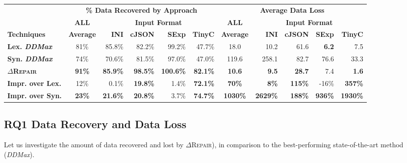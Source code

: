 \documentclass[acmsmall,screen,review,anonymous]{acmart}
\newcommand{\approach}{\textsc{$\Delta$Repair}\xspace}
\newcommand{\ddmax}{\textit{DDMax}\xspace}
\begin{document}
\begin{table*}[!tbp]\centering
\caption{Data Recovery (file size difference) and Data Loss  (Levenshtein distance) of \approach vs. %
lexical (Lex.) \ddmax and syntactic (Syn.) \ddmax. 
The highest data recovery and lowest data loss are in bold, percentage improvement (Impr.) %
of \approach over the best baseline which are significant (i.e., greater than five percent ($>$5\%)) are also in bold.
}
\footnotesize
\begin{tabular}{|l | c |  r  r  r  r  | c |  r  r  r  r |}
\hline
 &  \multicolumn{5}{c|}{\textbf{\% Data Recovered by Approach}} &  \multicolumn{5}{c|}{\textbf{Average Data Loss }}  \\
&  \multicolumn{1}{c|}{\textbf{ALL}} & \multicolumn{4}{c|}{\textbf{Input Format}}  &  \multicolumn{1}{c|}{\textbf{ALL}} & \multicolumn{4}{c|}{\textbf{Input Format}}  \\
\textbf{Techniques} & \textbf{Average} & \textbf{INI} & \textbf{cJSON} & \textbf{SExp} & \textbf{TinyC} & \textbf{Average} & \textbf{INI} & \textbf{cJSON} & \textbf{SExp} & \textbf{TinyC} \\
\hline
\textbf{Lex. \ddmax} & 81\%  & 85.8\% & 82.2\%	 & 99.2\%	& 47.7\% & 18.0 & {10.2} &	61.6 &	\textbf{6.2} & 7.5 \\			
\textbf{Syn. \ddmax} & 74\%  &  70.6\% & 81.5\%  & 97.0\%	& 47.0\% & 119.6 &  258.1 & 82.7 &	76.6 &	33.3 \\	
\hline
\textbf{\approach} & \textbf{91\%}  &  \textbf{85.9\%} & \textbf{98.5\%} & \textbf{100.6\%} & \textbf{82.1\%} & \textbf{10.6}  & \textbf{9.5} &	\textbf{28.7} &	7.4 & \textbf{1.6} \\
\hline
\textbf{Impr. over Lex.} & 12\% &  0.1\%	& \textbf{19.8\%}	& 1.4\%	& \textbf{72.1\%} & \textbf{70\%} &  \textbf{8\%} & \textbf{115\%} & -16\% & \textbf{357\%} \\
\textbf{Impr. over Syn.} & \textbf{23\%}  &  \textbf{21.6\%} 	& \textbf{20.8\%}	& 3.7\%	& \textbf{74.7\% }  & \textbf{1030\%} & \textbf{2629\%} &	\textbf{188\%} & \textbf{936\%} &\textbf{ 1930\%} \\
\hline
\end{tabular}
\label{tab:data-recovery-and-loss}
\end{table*}


\subsection{RQ1 Data Recovery and Data Loss} 
Let us investigate the amount of data recovered and lost by \approach), in comparison to
the best-performing state-of-the-art method (\ddmax). 
\end{document}

